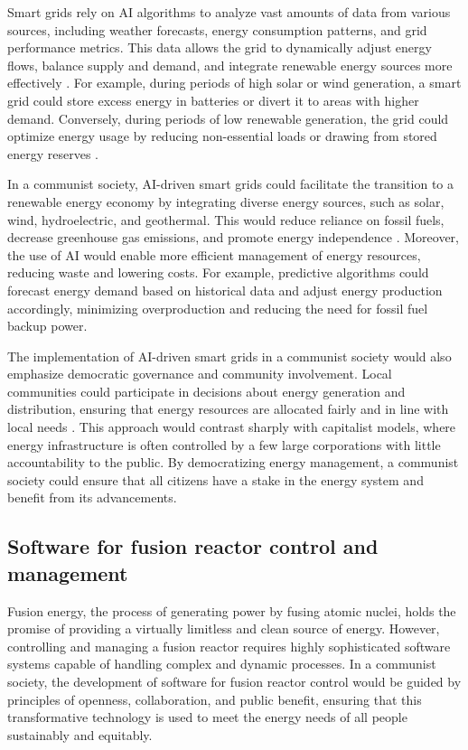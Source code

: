Smart grids rely on AI algorithms to analyze vast amounts of data from various sources, including weather forecasts, energy consumption patterns, and grid performance metrics. This data allows the grid to dynamically adjust energy flows, balance supply and demand, and integrate renewable energy sources more effectively \cite[pp.~45-52]{hoffman2012smart}. For example, during periods of high solar or wind generation, a smart grid could store excess energy in batteries or divert it to areas with higher demand. Conversely, during periods of low renewable generation, the grid could optimize energy usage by reducing non-essential loads or drawing from stored energy reserves \cite[pp.~89-95]{stoll2019ai}.

In a communist society, AI-driven smart grids could facilitate the transition to a renewable energy economy by integrating diverse energy sources, such as solar, wind, hydroelectric, and geothermal. This would reduce reliance on fossil fuels, decrease greenhouse gas emissions, and promote energy independence \cite[pp.~134-140]{kassakian2011smart}. Moreover, the use of AI would enable more efficient management of energy resources, reducing waste and lowering costs. For example, predictive algorithms could forecast energy demand based on historical data and adjust energy production accordingly, minimizing overproduction and reducing the need for fossil fuel backup power.

The implementation of AI-driven smart grids in a communist society would also emphasize democratic governance and community involvement. Local communities could participate in decisions about energy generation and distribution, ensuring that energy resources are allocated fairly and in line with local needs \cite[pp.~150-158]{johnson2018renewable}. This approach would contrast sharply with capitalist models, where energy infrastructure is often controlled by a few large corporations with little accountability to the public. By democratizing energy management, a communist society could ensure that all citizens have a stake in the energy system and benefit from its advancements.

\subsection{Software for fusion reactor control and management}

Fusion energy, the process of generating power by fusing atomic nuclei, holds the promise of providing a virtually limitless and clean source of energy. However, controlling and managing a fusion reactor requires highly sophisticated software systems capable of handling complex and dynamic processes. In a communist society, the development of software for fusion reactor control would be guided by principles of openness, collaboration, and public benefit, ensuring that this transformative technology is used to meet the energy needs of all people sustainably and equitably.

